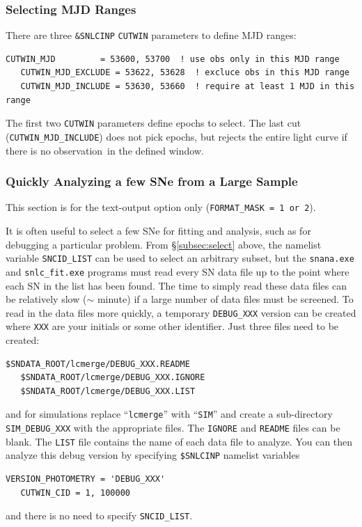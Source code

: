 \documentclass[12pt]{article}
\newcommand{\obs}{observation}
\begin{document}
\subsubsection{Selecting MJD Ranges}

There are three {\tt \&SNLCINP} {\tt CUTWIN} parameters to define
MJD ranges:
\begin{Verbatim}[frame=single]
   CUTWIN_MJD         = 53600, 53700  ! use obs only in this MJD range
   CUTWIN_MJD_EXCLUDE = 53622, 53628  ! excluce obs in this MJD range   
   CUTWIN_MJD_INCLUDE = 53630, 53660  ! require at least 1 MJD in this range
\end{Verbatim}
The first two {\tt CUTWIN} parameters define epochs to select.
The last cut ({\tt CUTWIN\_MJD\_INCLUDE}) does not pick epochs,
but rejects the entire light curve if there is no \obs\ in the
defined window.

   \subsubsection{Quickly Analyzing a few SNe from a Large Sample}
   \label{subsec:quickAnal}

This section is for the text-output option only
({\tt FORMAT\_MASK = 1 or 2}).

It is often useful to select a few SNe for fitting and analysis, 
such as for debugging a particular problem. 
From \S\ref{subsec:select} above, the namelist variable
{\tt SNCID\_LIST} can be used to select an arbitrary subset,
but the {\tt snana.exe} and {\tt snlc\_fit.exe} programs
must read every SN data file up to the point where
each SN in the list has been found. The time to simply 
read these data files can be relatively slow ($\sim$ minute)
if a large number of data files must be screened.
To read in the data files more quickly,
a temporary {\tt DEBUG\_XXX} version
can be created where {\tt XXX} are your initials or some other
identifier. Just three files need to be created:
%
\begin{Verbatim}[frame=single]
   $SNDATA_ROOT/lcmerge/DEBUG_XXX.README
   $SNDATA_ROOT/lcmerge/DEBUG_XXX.IGNORE
   $SNDATA_ROOT/lcmerge/DEBUG_XXX.LIST
\end{Verbatim}
%
and for simulations replace ``{\tt lcmerge}''
with ``{\tt SIM}'' and create a sub-directory {\tt SIM\_DEBUG\_XXX}
with the appropriate files.
The {\tt IGNORE} and {\tt README} files can be blank.
The {\tt LIST} file contains the name of each data file
to analyze. You can then analyze this debug version by
specifying {\tt \$SNLCINP} namelist variables
\begin{Verbatim}[frame=single]
   VERSION_PHOTOMETRY = 'DEBUG_XXX'
   CUTWIN_CID = 1, 100000
\end{Verbatim}
%
and there is no need to specify {\tt SNCID\_LIST}.
\end{document}

